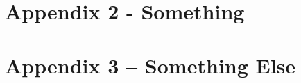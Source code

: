 
\clearpage
{}
{}\label{chapter:appendix-something}
\chapter*{Appendix 2 - Something}


\clearpage
{}
{}\label{chapter:appendix-something-else}
\chapter*{Appendix 3 -- Something Else}


